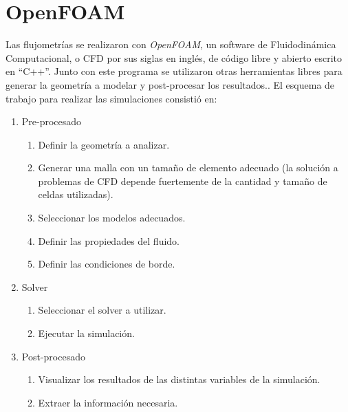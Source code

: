 \section{OpenFOAM}\label{sec:3_openfoam}
%
Las flujometrías se realizaron con \emph{OpenFOAM}, un software de
Fluidodinámica Computacional, o CFD por sus siglas en inglés, de código libre y
abierto escrito en ``C++''.
%
%
Junto con este programa se utilizaron otras herramientas libres para generar la
geometría a modelar y post-procesar los resultados..
%
El esquema de trabajo para realizar las simulaciones consistió en:

\begin{enumerate}
    \item Pre-procesado

        \begin{enumerate}
            \item Definir la geometría a analizar.
            \item Generar una malla con un tamaño de elemento adecuado (la
solución a problemas de CFD depende fuertemente de la cantidad y tamaño de
celdas utilizadas).
            \item Seleccionar los modelos adecuados.
            \item Definir las propiedades del fluido.
            \item Definir las condiciones de borde.

        \end{enumerate}
    \item Solver
    \begin{enumerate} \item Seleccionar el solver a utilizar.
            \item Ejecutar la simulación.
    \end{enumerate}
\item Post-procesado
    \begin{enumerate}
        \item Visualizar los resultados de las distintas variables de la
            simulación.
        \item Extraer la información necesaria.
    \end{enumerate}
\end{enumerate}

